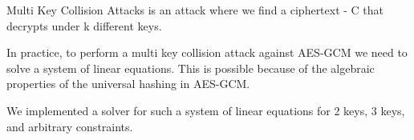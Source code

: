 Multi Key Collision Attacks is an attack where we find a ciphertext - C that decrypts under k different keys.

In practice, to perform a multi key collision attack against AES-GCM
we need to solve a system of linear equations.
This is possible because of the algebraic properties of the universal hashing in AES-GCM.

We implemented a solver for such a system of linear equations for 2 keys, 3 keys, and arbitrary constraints.